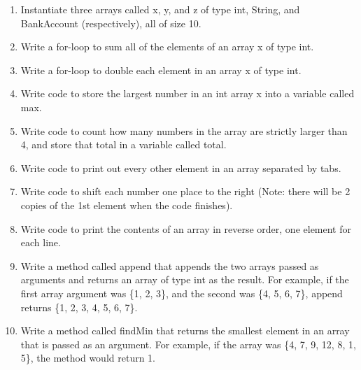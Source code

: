 \setcounter{counter}{1}
\begin{enumerate}[label={\arabic{counter}\addtocounter{counter}{1}}.]

\item Instantiate three arrays called x, y, and z of type int, String, and BankAccount (respectively), all of size 10.

\item Write a for-loop to sum all of the elements of an array x of type int.

\item Write a for-loop to double each element in an array x of type int.

\item Write code to store the largest number in an int array x into a variable called max.

\item Write code to count how many numbers in the array are strictly larger than 4, and store that total in a variable called total.

\item Write code to print out every other element in an array separated by tabs.

\item Write code to shift each number one place to the right (Note: there will be 2 copies of the 1st element when the code finishes).

\item Write code to print the contents of an array in reverse order, one element for each line.

\item Write a method called append that appends the two arrays passed as arguments and returns an array of type int as the result. For example, if the first array argument was \{1, 2, 3\}, and the second was \{4, 5, 6, 7\}, append returns \{1, 2, 3, 4, 5, 6, 7\}.

\item Write a method called findMin that returns the smallest element in an array that is passed as an argument. For example, if the array was \{4, 7, 9, 12, 8, 1, 5\}, the method would return 1.

\end{enumerate}